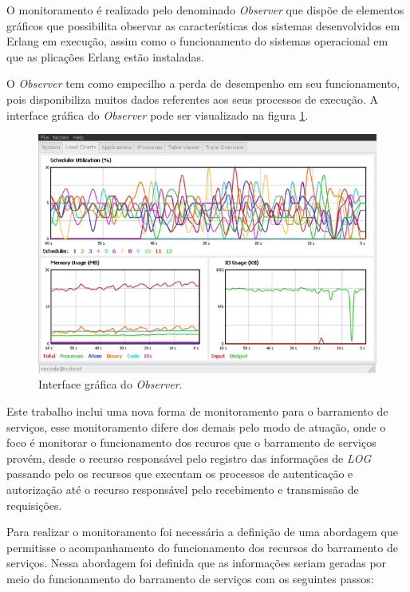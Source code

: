 O monitoramento é realizado pelo denominado \textit{Observer} que dispõe de elementos gráficos que possibilita observar as características dos sistemas desenvolvidos em Erlang \cite{ericssonAB2002-2019} em execução, assim como o funcionamento do sistemas operacional em que as plicações Erlang estão instaladas. 

O \textit{Observer} tem como empecilho a perda de desempenho em seu funcionamento, pois disponibiliza muitos dados referentes aos seus processos de execução. A interface gráfica do \textit{Observer} pode ser visualizado na figura \ref{fun:fig:observer}. 

\begin{figure}[H]
	\begin{center}
	\includegraphics[scale = 0.70]{img/observerGo.jpg}
		\caption{Interface gráfica do \textit{Observer}.}
		\label{fun:fig:observer}
	\end{center}
\end{figure}

Este trabalho inclui uma nova forma de monitoramento para o barramento de serviços, esse monitoramento difere dos demais pelo modo de atuação, onde o foco é monitorar o funcionamento dos recuros que o barramento de serviços provém, desde o recurso responsável pelo registro das informações de \textit{LOG} passando pelo os recursos que executam os processos de autenticação e autorização até o recurso responsável pelo recebimento e transmissão de requisições. 

Para realizar o monitoramento foi necessária a definição de uma abordagem que permitisse o acompanhamento do funcionamento dos recursos do barramento de serviços. Nessa abordagem foi definida que as informações seriam geradas por meio do funcionamento do barramento de serviços com os seguintes passos:

